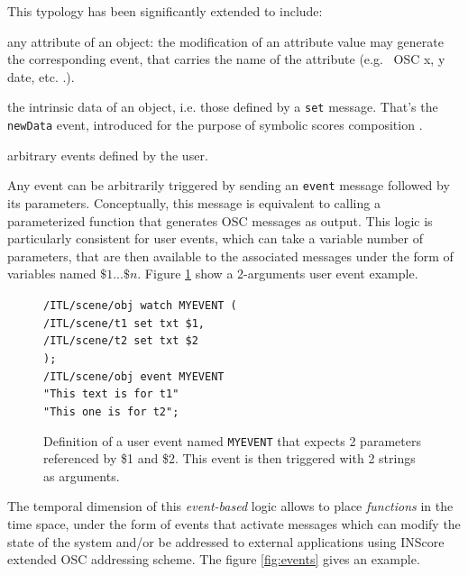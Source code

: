 \documentclass{article}
\newcommand{\OSC}[1]	{{\fontsize{9pt}{9pt} \selectfont\texttt{#1}}}
\newcommand{\tab}{\hspace*{4mm}}
\let\olditemize\itemize
\let\oldenditemize\enditemize
\renewenvironment{itemize} 	{\olditemize \renewcommand{\labelitemi}{$\bullet$} \setlength{\itemsep}{0mm}}{\oldenditemize}
\newcommand{\sample}[1]		{\vspace{-0.2em}\begin{center}\colorbox{mygrey}{\begin{minipage}[t]{0.98\columnwidth} {\small \texttt{#1}}\end{minipage}}\end{center}}
\begin{document}
This typology has been significantly extended to include:
\begin{itemize}
\item any attribute of an object: the modification of an attribute value may generate the corresponding event, that carries the name of the attribute (e.g. \ OSC {x, y date}, etc. .).
\item the intrinsic data of an object, i.e. those defined by a \OSC{set} message. That's the \OSC{newData} event, introduced for the purpose of symbolic scores composition \cite{lepetit16}.
\item arbitrary events defined by the user.
\end{itemize}

Any event can be arbitrarily triggered by sending an \OSC{event} message followed by its parameters. Conceptually, this message  is equivalent to calling a parameterized function that generates OSC messages as output.
This logic is particularly consistent for user events, which can take a variable number of parameters, that are then available to the associated messages under the form of variables named $\$1 ... \$n$. Figure \ref{fig:uevent} show a 2-arguments user event example.

\begin{figure}[h]
   \centering
   \sample{/ITL/scene/obj watch MYEVENT ( \\
\tab/ITL/scene/t1 set txt \$1, \\
\tab/ITL/scene/t2 set txt \$2 \\
);   \\   
/ITL/scene/obj event MYEVENT \\
\hspace*{25mm}"This text is for t1"\\
\hspace*{25mm}"This one is for t2"; 
}
   \caption{Definition of a user event named \OSC{MYEVENT} that expects 2 parameters referenced by \$1 and \$2. This event is then triggered with 2 strings as arguments.}
   \label{fig:uevent}
\end{figure}

The temporal dimension of this \emph{event-based} logic allows to place \emph{functions} in the time space, under the form of events that activate messages which can modify the state of the system and/or be addressed to external applications using INScore extended OSC addressing scheme. The figure \ref{fig:events} gives an example.
  
\end{document}
